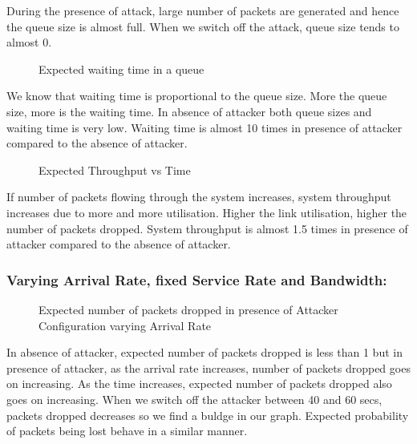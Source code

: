 During the presence of attack, large number of packets are generated and hence the queue size is almost full. When we switch off the attack, queue size tends to almost 0.

\begin{figure}[!htb]
	\centering
	\qquad
	\caption{{Expected waiting time in a queue}}
	\label{fig:figae}
\end{figure}

We know that waiting time is proportional to the queue size. More the queue size, more is the waiting time. In absence of attacker both queue sizes and waiting time is very low. Waiting time is almost 10 times in presence of attacker compared to the absence of attacker. 

\pagebreak

\begin{figure}[!htb]
	\centering
	\qquad
	\caption{{Expected Throughput vs Time}}
	\label{fig:figaf}
\end{figure}

If number of packets flowing through the system increases, system throughput increases due to more and more utilisation. Higher the link utilisation, higher the number of packets dropped. System throughput is almost 1.5 times in presence of attacker compared to the absence of attacker.   

\subsubsection*{Varying Arrival Rate, fixed Service Rate and Bandwidth:}

\begin{figure}[H]
		\centering
		\caption{{Expected number of packets dropped in presence of Attacker Configuration varying Arrival Rate}}
		\label{fig:figba}
\end{figure}

\pagebreak

In absence of attacker, expected number of packets dropped is less than 1 but in presence of attacker, as the arrival rate increases, number of packets dropped goes on increasing. As the time increases, expected number of packets dropped also goes on increasing. When we switch off the attacker between 40 and 60 secs, packets dropped decreases so we find a buldge in our graph. Expected probability of packets being lost behave in a similar manner.

